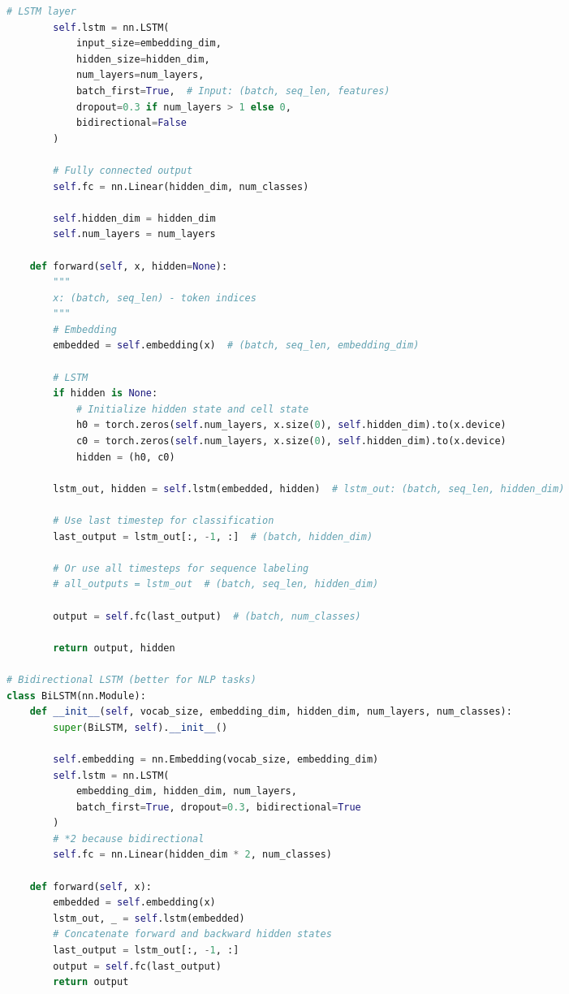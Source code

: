 \documentclass[8pt,landscape]{article}
\begin{document}
\begin{multicols}{3}
\begin{lstlisting}[language=Python]
        # LSTM layer
        self.lstm = nn.LSTM(
            input_size=embedding_dim,
            hidden_size=hidden_dim,
            num_layers=num_layers,
            batch_first=True,  # Input: (batch, seq_len, features)
            dropout=0.3 if num_layers > 1 else 0,
            bidirectional=False
        )

        # Fully connected output
        self.fc = nn.Linear(hidden_dim, num_classes)

        self.hidden_dim = hidden_dim
        self.num_layers = num_layers

    def forward(self, x, hidden=None):
        """
        x: (batch, seq_len) - token indices
        """
        # Embedding
        embedded = self.embedding(x)  # (batch, seq_len, embedding_dim)

        # LSTM
        if hidden is None:
            # Initialize hidden state and cell state
            h0 = torch.zeros(self.num_layers, x.size(0), self.hidden_dim).to(x.device)
            c0 = torch.zeros(self.num_layers, x.size(0), self.hidden_dim).to(x.device)
            hidden = (h0, c0)

        lstm_out, hidden = self.lstm(embedded, hidden)  # lstm_out: (batch, seq_len, hidden_dim)

        # Use last timestep for classification
        last_output = lstm_out[:, -1, :]  # (batch, hidden_dim)

        # Or use all timesteps for sequence labeling
        # all_outputs = lstm_out  # (batch, seq_len, hidden_dim)

        output = self.fc(last_output)  # (batch, num_classes)

        return output, hidden

# Bidirectional LSTM (better for NLP tasks)
class BiLSTM(nn.Module):
    def __init__(self, vocab_size, embedding_dim, hidden_dim, num_layers, num_classes):
        super(BiLSTM, self).__init__()

        self.embedding = nn.Embedding(vocab_size, embedding_dim)
        self.lstm = nn.LSTM(
            embedding_dim, hidden_dim, num_layers,
            batch_first=True, dropout=0.3, bidirectional=True
        )
        # *2 because bidirectional
        self.fc = nn.Linear(hidden_dim * 2, num_classes)

    def forward(self, x):
        embedded = self.embedding(x)
        lstm_out, _ = self.lstm(embedded)
        # Concatenate forward and backward hidden states
        last_output = lstm_out[:, -1, :]
        output = self.fc(last_output)
        return output


\end{lstlisting}
\end{multicols}
\end{document}
